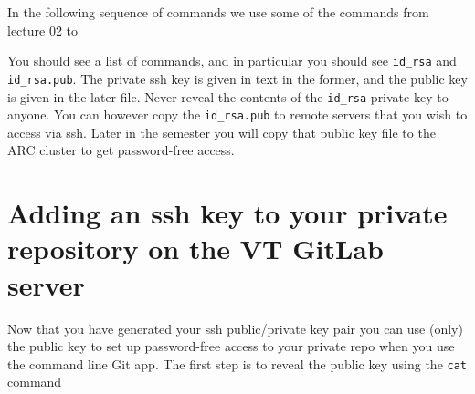 \vspace{8pt}\noindent In the following sequence of commands we use some of the commands from lecture 02 to 


You should see a list of commands, and in particular you should see \verb|id_rsa| and \verb|id_rsa.pub|. The private ssh key is given in text in the former, and the public key is given in the later file. Never reveal the contents of the \verb|id_rsa| private key to anyone. You can however copy the \verb|id_rsa.pub| to remote servers that you wish to access via ssh. Later in the semester you will copy that public key file to the ARC cluster to get password-free access.

\section{Adding an ssh key to your private repository on the VT GitLab server}

Now that you have generated your ssh public/private key pair you can use (only) the public key to set up password-free access to your private repo when you use the command line Git app. The first step is to reveal the public key using the \verb|cat| command


